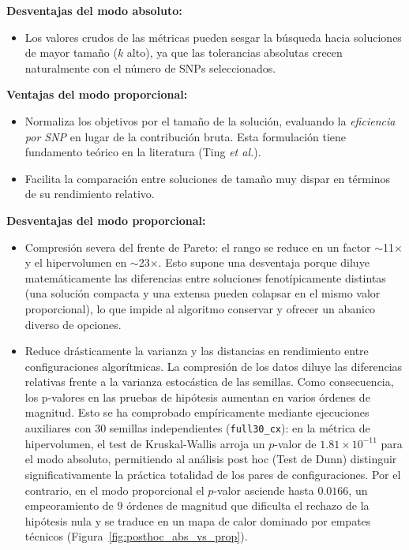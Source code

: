 \documentclass[a4paper,10pt]{article}
\begin{document}
\textbf{Desventajas del modo absoluto:}
\begin{itemize}
    \item Los valores crudos de las métricas pueden sesgar la búsqueda hacia soluciones de mayor tamaño ($k$ alto), ya que las tolerancias absolutas crecen naturalmente con el número de SNPs seleccionados.
\end{itemize}

\textbf{Ventajas del modo proporcional:}
\begin{itemize}
    \item Normaliza los objetivos por el tamaño de la solución, evaluando la \textit{eficiencia por SNP} en lugar de la contribución bruta. Esta formulación tiene fundamento teórico en la literatura (Ting \textit{et al.}).
    \item Facilita la comparación entre soluciones de tamaño muy dispar en términos de su rendimiento relativo.
\end{itemize}

\textbf{Desventajas del modo proporcional:}
\begin{itemize}
    \item Compresión severa del frente de Pareto: el rango se reduce en un factor $\sim$11$\times$ y el hipervolumen en $\sim$23$\times$. Esto supone una desventaja porque diluye matemáticamente las diferencias entre soluciones fenotípicamente distintas (una solución compacta y una extensa pueden colapsar en el mismo valor proporcional), lo que impide al algoritmo conservar y ofrecer un abanico diverso de opciones.
    \item Reduce drásticamente la varianza y las distancias en rendimiento entre configuraciones algorítmicas. La compresión de los datos diluye las diferencias relativas frente a la varianza estocástica de las semillas. Como consecuencia, los p-valores en las pruebas de hipótesis aumentan en varios órdenes de magnitud. Esto se ha comprobado empíricamente mediante ejecuciones auxiliares con 30 semillas independientes (\texttt{full30\_cx}): en la métrica de hipervolumen, el test de Kruskal-Wallis arroja un $p$-valor de $1.81 \times 10^{-11}$ para el modo absoluto, permitiendo al análisis post hoc (Test de Dunn) distinguir significativamente la práctica totalidad de los pares de configuraciones. Por el contrario, en el modo proporcional el $p$-valor asciende hasta $0.0166$, un empeoramiento de $9$ órdenes de magnitud que dificulta el rechazo de la hipótesis nula y se traduce en un mapa de calor dominado por empates técnicos (Figura~\ref{fig:posthoc_abs_vs_prop}).
\end{itemize}
\end{document}
